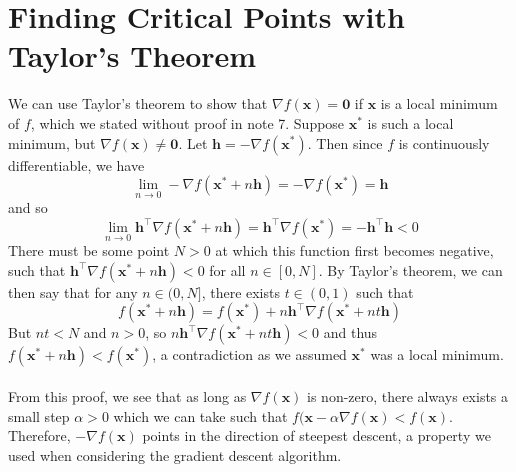 \documentclass{article}
\begin{document}
\section{Finding Critical Points with Taylor's Theorem}
We can use Taylor's theorem to show that $\nabla f(\mathbf{x}) = \mathbf{0}$ if $\mathbf{x}$ is a local minimum of $f$, which we stated without proof in note 7. Suppose $\mathbf{x^*}$ is such a local minimum, but $\nabla f(\mathbf{x}) \neq \mathbf{0}$. Let $\mathbf{h} = -\nabla f(\mathbf{x^*})$. Then since $f$ is continuously differentiable, we have $$\lim_{n \rightarrow 0} -\nabla f(\mathbf{x^*} + n\mathbf{h}) = -\nabla f(\mathbf{x^*}) = \mathbf{h}$$ and so $$\lim_{n \rightarrow 0}\mathbf{h}^\top \nabla f(\mathbf{x^*} + n\mathbf{h}) = \mathbf{h}^\top\nabla f(\mathbf{x^*}) = -\mathbf{h^\top h} < 0$$ There must be some point $N > 0$ at which this function first becomes negative, such that $\mathbf{h}^\top \nabla f(\mathbf{x^*} + n\mathbf{h}) < 0$ for all $n \in [0, N]$. By Taylor's theorem, we can then say that for any $n \in (0, N]$, there exists $t \in (0, 1)$ such that $$f(\mathbf{x^*} + n\mathbf{h}) = f(\mathbf{x^*}) + n\mathbf{h}^\top\nabla f(\mathbf{x^*} + nt\mathbf{h})$$ But $nt < N$ and $n > 0$, so $n\mathbf{h}^\top\nabla f(\mathbf{x^*} + nt\mathbf{h}) < 0$ and thus $f(\mathbf{x^*} + n\mathbf{h}) < f(\mathbf{x^*})$, a contradiction as we assumed $\mathbf{x^*}$ was a local minimum. \\\\
From this proof, we see that as long as $\nabla f(\mathbf{x})$ is non-zero, there always exists a small step $\alpha > 0$ which we can take such that $f(\mathbf{x} - \alpha\nabla f(\mathbf{x}) < f(\mathbf{x})$. Therefore, $-\nabla f(\mathbf{x})$ points in the direction of steepest descent, a property we used when considering the gradient descent algorithm.
\end{document}
